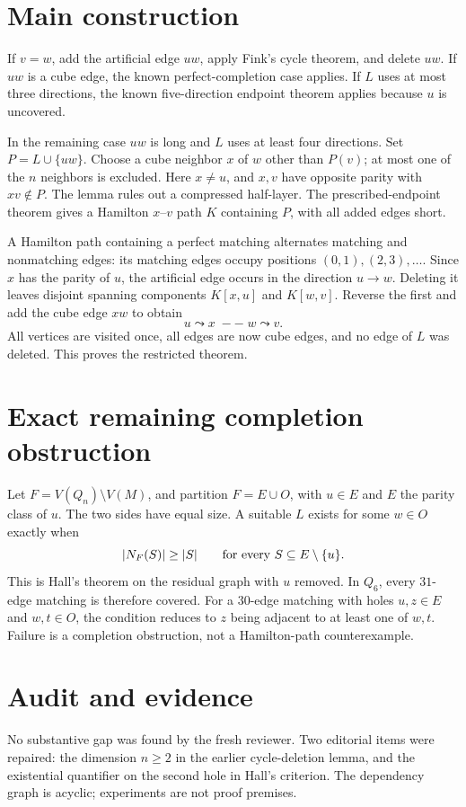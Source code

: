 \documentclass[11pt]{article}
\newcommand{\Q}{Q_n}
\begin{document}
\section*{Main construction}
If $v=w$, add the artificial edge $uw$, apply Fink's cycle theorem, and
delete $uw$. If $uw$ is a cube edge, the known perfect-completion case
applies. If $L$ uses at most three directions, the known five-direction
endpoint theorem applies because $u$ is uncovered.

In the remaining case $uw$ is long and $L$ uses at least four directions.
Set $P=L\cup\{uw\}$. Choose a cube neighbor $x$ of $w$ other than $P(v)$;
at most one of the $n$ neighbors is excluded. Here $x\ne u$, and $x,v$
have opposite parity with $xv\notin P$.
The lemma rules out a compressed half-layer. The prescribed-endpoint theorem
gives a Hamilton $x$--$v$ path $K$ containing $P$, with all added edges short.

A Hamilton path containing a perfect matching alternates matching and
nonmatching edges: its matching edges occupy positions $(0,1),(2,3),\ldots$.
Since $x$ has the parity of $u$, the artificial edge occurs in the direction
$u\to w$. Deleting it leaves disjoint spanning components $K[x,u]$ and
$K[w,v]$. Reverse the first and add the cube edge $xw$ to obtain
\[
u\leadsto x\;--\;w\leadsto v.
\]
All vertices are visited once, all edges are now cube edges, and no edge of
$L$ was deleted. This proves the restricted theorem.

\section*{Exact remaining completion obstruction}
Let $F=V(\Q)\setminus V(M)$, and partition $F=E\cup O$, with $u\in E$ and
$E$ the parity class of $u$. The two sides have equal size. A suitable $L$
exists for some $w\in O$ exactly when
\[
|N_F(S)|\ge |S|\qquad\hbox{for every }S\subseteq E\setminus\{u\}.
\]
This is Hall's theorem on the residual graph with $u$ removed. In $Q_6$,
every $31$-edge matching is therefore covered. For a $30$-edge matching with
holes $u,z\in E$ and $w,t\in O$, the condition reduces to $z$ being adjacent
to at least one of $w,t$. Failure is a completion obstruction, not a
Hamilton-path counterexample.

\section*{Audit and evidence}
No substantive gap was found by the fresh reviewer. Two editorial items
were repaired: the dimension $n\ge2$ in the earlier cycle-deletion lemma,
and the existential quantifier on the second hole in Hall's criterion.
The dependency graph is acyclic; experiments are not proof premises.
\end{document}
